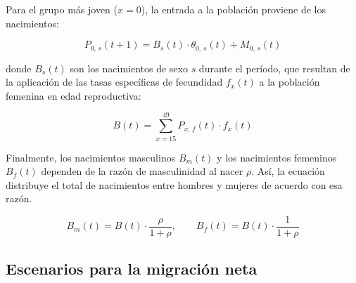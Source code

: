 \documentclass[12pt,a4paper]{article}
\begin{document}
Para el grupo más joven ($x = 0$), la entrada a la población proviene de los nacimientos:

\begin{equation}
\label{eq:nacimientos}
P_{0,\, s}(t+1) = B_s(t) \cdot \theta_{0,\, s}(t) + M_{0,\, s}(t)
\end{equation}

\noindent donde $B_s(t)$ son los nacimientos de sexo $s$ durante el período, que resultan de la aplicación de las tasas específicas de fecundidad $f_x(t)$ a la población femenina en edad reproductiva:

\begin{equation}
\label{eq:fecundidad}
B(t) = \sum_{x=15}^{49} P_{x,\, f}(t) \cdot f_x(t)
\end{equation}


Finalmente,  los nacimientos masculinos $B_m(t)$ y  los nacimientos femeninos $B_f(t)$ dependen de la razón de masculinidad al nacer $\rho$. Así, la ecuación distribuye el total de nacimientos entre hombres y mujeres de acuerdo con esa razón.

\begin{equation}
B_m(t) = B(t) \cdot \frac{\rho}{1 + \rho}, \qquad B_f(t) = B(t) \cdot \frac{1}{1 + \rho}
\end{equation}







\subsection{Escenarios para la migración neta}
\end{document}
